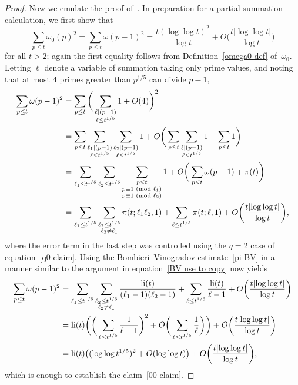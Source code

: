 \documentclass[12pt,reqno]{amsart}
\theoremstyle{definition}
\renewcommand{\mod}[1]{{\ifmmode\text{\rm\ (mod~$#1$)}\else\discretionary{}{}{\hbox{ }}\rm(mod~$#1$)\fi}}
\newcommand{\li}{\mathop{\rm li}\nolimits}
\begin{document}
\begin{proof}
Now we emulate the proof of~\cite[Lemma 2.2]{ep85}. In preparation for a partial summation calculation, we first show that
\begin{equation}  \label{00 claim}
\sum_{p \leq t} \omega_0(p)^2 = \sum_{p \le t} \omega(p-1)^2 = \frac{t(\log\log t)^2}{\log t} + O\bigg(\frac{t | \!\log\log t|}{\log t}\bigg)
\end{equation}
for all $t>2$; again the first equality follows from Definition~\ref{omega0 def} of~$\omega_0$. Letting $\ell$ denote a variable of summation taking only prime values, and noting that at most $4$ primes greater than $p^{1/5}$ can divide $p-1$,
\begin{align*}
\sum_{p \le t} \omega(p-1)^2 &= \sum_{p \le t} \bigg( \sum_{\substack{\ell \mid (p-1) \\ \ell\le t^{1/5}}} 1 + O(4) \bigg)^2 \\
&= \sum_{p \le t} \sum_{\substack{\ell_1 \mid (p-1) \\ \ell\le t^{1/5}}} \sum_{\substack{\ell_2 \mid (p-1) \\ \ell\le t^{1/5}}} 1 + O\bigg( \sum_{p \le t} \sum_{\substack{\ell \mid (p-1) \\ \ell\le t^{1/5}}} 1 + \sum_{p \le t} 1 \bigg) \\
&= \sum_{\substack{\ell_1\le t^{1/5}}} \sum_{\substack{\ell_2\le t^{1/5}}} \sum_{\substack{p\le t \\ p\equiv1\mod{\ell_1} \\ p\equiv1\mod{\ell_2}}} 1 + O\bigg( \sum_{p \le t} \omega(p-1) + \pi(t) \bigg) \\
&= \sum_{\substack{\ell_1\le t^{1/5}}} \sum_{\substack{\ell_2\le t^{1/5} \\ \ell_2\ne\ell_1}} \pi(t;\ell_1\ell_2,1) + \sum_{\substack{\ell\le t^{1/5}}} \pi(t;\ell,1) + O\bigg( \frac{t|\!\log\log t|}{\log t} \bigg),
\end{align*}
where the error term in the last step was controlled using the $q=2$ case of equation~\eqref{q0 claim}.
Using the Bombieri--Vinogradov estimate~\eqref{pi BV} in a manner similar to the argument in equation~\eqref{BV use to copy} now yields
\begin{align*}
\sum_{p \le t} \omega(p-1)^2 &= \sum_{\substack{\ell_1\le t^{1/5}}} \sum_{\substack{\ell_2\le t^{1/5} \\ \ell_2\ne\ell_1}} \frac{\li(t)}{(\ell_1-1)(\ell_2-1)} + \sum_{\substack{\ell\le t^{1/5}}} \frac{\li(t)}{\ell-1} + O\bigg( \frac{t|\!\log\log t|}{\log t} \bigg) \\
&= \li(t) \bigg( \bigg( \sum_{\substack{\ell\le t^{1/5}}} \frac1{\ell-1} \bigg)^2 + O\bigg( \sum_{\substack{\ell\le t^{1/5}}} \frac1{\ell} \bigg) \bigg) + O\bigg( \frac{t|\!\log\log t|}{\log t} \bigg) \\
&= \li(t) \big( (\log\log t^{1/5})^2 + O(\log\log t) \big) + O\bigg( \frac{t|\!\log\log t|}{\log t} \bigg),
\end{align*}
which is enough to establish the claim~\eqref{00 claim}.


\end{proof}
\end{document}
